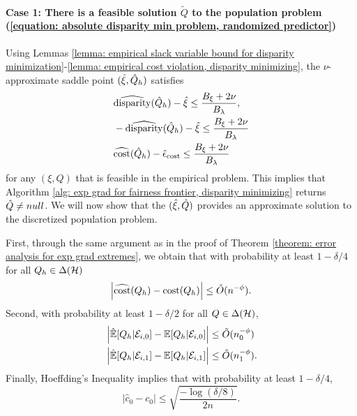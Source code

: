 \documentclass{article}
\begin{document}
\paragraph{Case 1: There is a feasible solution $\tilde Q$ to the population problem (\ref{equation: absolute disparity min problem, randomized predictor})} Using Lemmas \ref{lemma: empirical slack variable bound for disparity minimization}-\ref{lemma: empirical cost violation, disparity minimizing}, the $\nu$-approximate saddle point $(\hat \xi, \hat{Q}_h)$ satisfies 
            \begin{align}
                & \widehat{\operatorname{disparity}}(\hat{Q}_h) - \hat \xi \leq \frac{B_\xi + 2 \nu}{B_\lambda}, \\
                & -\widehat{\operatorname{disparity}}(\hat{Q}_h) - \hat \xi \leq \frac{B_\xi + 2 \nu}{B_\lambda} \\
                & \widehat{\operatorname{cost}}(\hat{Q}_h) - \hat{\epsilon}_{\operatorname{cost}} \leq \frac{ B_\xi + 2 \nu }{ B_\lambda }
            \end{align}
for any $(\xi, Q)$ that is feasible in the empirical problem. This implies that Algorithm \ref{alg: exp grad for fairness frontier, disparity minimizing} returns $\hat{Q} \neq null$. We will now show that the $(\hat \xi, \hat{Q})$ provides an approximate solution to the discretized population problem.
        
First, through the same argument as in the proof of Theorem \ref{theorem: error analysis for exp grad extremes}, we obtain that with probability at least $1 - \delta/4$ for all $Q_h \in \Delta(\mathcal{H})$
        \begin{equation}\label{equation: cost bound disp min i}
            \left| \widehat{\operatorname{cost}}(Q_h) - \operatorname{cost}(Q_h) \right| \leq \tilde{O}(n^{-\phi}).
        \end{equation}
Second, with probability at least $1 - \delta/2$ for all $Q \in \Delta(\mathcal{H})$,
        \begin{align}\label{equation: disp bounds, disp min}
            & \left| \hat{\mathbb{E}}[Q_h | \mathcal{E}_{i,0}] - \mathbb{E}[Q_h | \mathcal{E}_{i,0}] \right| \leq \tilde{O}(n_0^{-\phi}) \\
            & \left| \hat{\mathbb{E}}[Q_h | \mathcal{E}_{i,1}] - \mathbb{E}[Q_h | \mathcal{E}_{i,1}] \right| \leq \tilde{O}(n_1^{-\phi}).
        \end{align} 
Finally, Hoeffding's Inequality implies that with probability at least $1 - \delta/4$,
        \begin{equation}\label{equation: Hoeffding for c0, disp min}
            |\hat{c}_0 - c_0| \leq \sqrt{ \frac{-\log(\delta/8)}{2n}}. 
        \end{equation}
        
\end{document}
